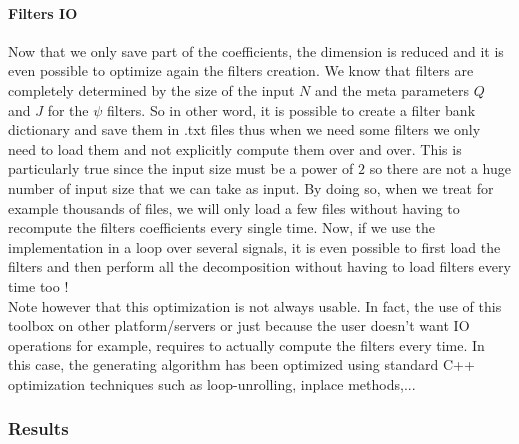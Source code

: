 \documentclass[a4paper]{report}
\begin{document}
\paragraph{Filters IO}

Now that we only save part of the coefficients, the dimension is reduced and it is even possible to optimize again the filters creation. We know that filters are completely determined by the size of the input $N$ and the meta parameters $Q$ and $J$ for the $\psi$ filters. So in other word, it is possible to create a filter bank dictionary and save them in .txt files thus when we need some filters we only need to load them and not explicitly compute them over and over. This is particularly true since the input size must be a power of $2$ so there are not a huge number of input size that we can take as input.
By doing so, when we treat for example thousands of files, we will only load a few files without having to recompute the filters coefficients every single time.
Now, if we use the implementation in a loop over several signals, it is even possible to first load the filters and then perform all the decomposition without having to load filters every time too ! 
\\Note however that this optimization is not always usable. In fact, the use of this toolbox on other platform/servers or just because the user doesn't want IO operations for example, requires to actually compute the filters every time. In this case, the generating algorithm has been optimized using standard C++ optimization techniques such as loop-unrolling, inplace methods,...


\subsubsection{Results}
\end{document}
